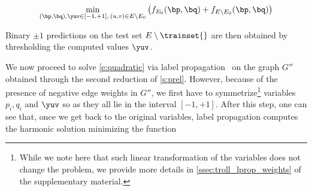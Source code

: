 \begin{equation}\label{e:quadratic}
  \min_{(\bp,\bq), \yuv \in [-1,+1],\,(u,v)\in E\setminus E_0}
  \left(f_{E_0}(\bp,\bq) + f_{E\setminus E_0}(\bp,\bq)\right)
\end{equation}

Binary $\pm 1$ predictions on the test set $E\setminus \trainset{}$ are then obtained by
thresholding the computed values $\yuv$.

\iffalse
********************************************************
and then solve for parameters $\{p_u, q_i\}_{u=1}^{|V|}$.
Yet, it may well be the case that some such parameters never occur in all these equations.\footnote
{
On the other hand, recall that no pairing $(u,v) \in E$ can occur more than once here, since \trainset{} is sampled without replacement.
}
This will happen precisely whenever $\Nout(u)$ or $\Nin(v)$ are not represented in \trainset{}. Specifically, if $E_0 \cap \Nout(u) = \emptyset$ then $p_u$ does not occur, and if $E_0 \cap \Nin(v) = \emptyset$ then $q_v$ does not occur. Hence, for each unsampled edge $(\ell,v)\in E\setminus \trainset{}$, we add to~(\ref{e:mlp2}) the equations
\[
p_{\ell}+q_v = 1+y_{\ell,v}~,
\]
motivated by the fact that $\E \left[\frac{1+y_{\ell,v}}{2}\,|\, (\ell,v)\right] =  \frac{p_{\ell}+q_v}{2}$. Similarly, we add to~(\ref{e:mlq2}) the equations
\[
p_u+q_{\ell} = 1+y_{u,\ell}~.
\]
This gives rise to the following set of equations
%
\begin{align}
p_{u}+ \frac{1}{\dout(u)}\,\sum_{v \in \Nout(u)} q_{v}
&=
\frac{1}{\dout(u)}\,\sum_{v=1}^{|V|} (1+\yuv), \qquad u = 1, \ldots, |V|~,\label{e:mlpa}\\
q_{v} +  \frac{1}{\din(v)}\,\sum_{u \in \Nin(v)} p_{u}
&=
\frac{1}{\din(v)}\,\sum_{u=1}^{|V|} (1+\yuv), \qquad v = 1, \ldots, |V|\,,\label{e:mlqa}\\
1+\yuv &= p_u+q_{v},\qquad\qquad\qquad\quad\,\, (u,v) \in E\setminus E_0~.\label{e:mlya}
\end{align}
%
*******************************************************
\fi

We now proceed to solve \eqref{e:quadratic} via label propagation~\autocite{LabelPropa03} on the
graph $G''$ obtained through the second reduction of \autoref{s:prel}.
However, because of the presence of negative edge weights in $G''$, we first have to symmetrize\footnote{%
While we note here that such linear transformation of the variables does not change the problem, we
provide more details in \autoref{ssec:troll_lprop_weights} of the supplementary material.} variables
$p_i, q_i$ and $\yuv$ so as they all lie in the interval $[-1,+1]$.
After this step, one can see that, once we get back to the original variables, label propagation
computes the harmonic solution minimizing the function

